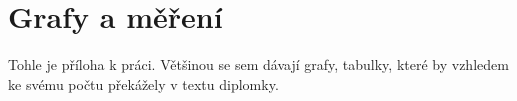 \documentclass[ing,male,java,dept460]{diploma}						%
\begin{document}
\appendix
\section{Grafy a měření}
Tohle je příloha k práci. Většinou se sem dávají grafy, tabulky, které by vzhledem
ke svému počtu překážely v textu diplomky.
\clearpage
\end{document}
